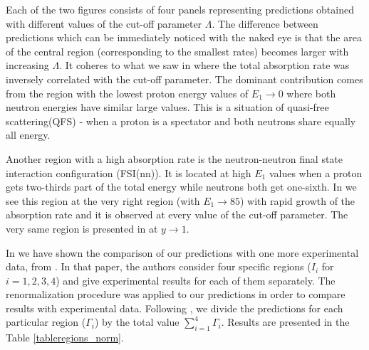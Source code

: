     Each of the two figures consists of four panels representing predictions obtained with different 
    values of the cut-off parameter $\Lambda$. The difference between predictions which can be immediately
    noticed with the naked eye is that the area of the central region (corresponding to the smallest rates)
    becomes larger with increasing $\Lambda$. It coheres to what we saw in 
    where the total absorption rate was inversely correlated with the cut-off parameter. The dominant contribution
    comes from the region with the lowest proton energy values of $E_1 \rightarrow 0$ where both neutron energies 
    have similar large values.
    This is a situation of quasi-free scattering(QFS) - when a proton is a spectator and both neutrons share equally all energy. 

    Another region with a high absorption rate is the neutron-neutron final state interaction configuration (FSI(nn)).
    It is located at high $E_1$ values when a proton gets two-thirds part of the total energy while neutrons both get
    one-sixth. In  we see this region at the very right region (with $E_1 \rightarrow 85$)
    with rapid growth of the absorption rate and it is observed at every value of the cut-off parameter. The very same region 
    is presented in   at $y \rightarrow 1$. 

    In \cite{golak_pion} we have shown the comparison of our predictions with one more experimental data,
    from \cite{Gotta1995}. In that paper, the authors consider four specific regions ($I_i$ for $i=1,2,3,4$) and give experimental results
    for each of them separately. The renormalization procedure was applied to our predictions in order to compare results with experimental data. Following \cite{Gotta1995}, we divide the predictions for each particular region ($\Gamma_i$) by the total value $\sum_{i=1}^{4}\Gamma_i$. Results are presented in the Table \ref{tableregions_norm}.

